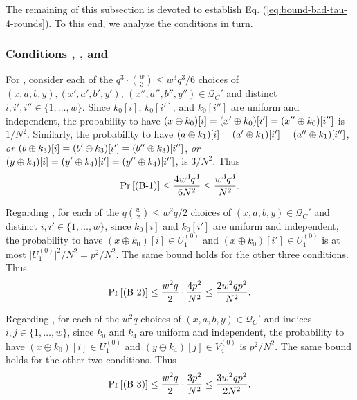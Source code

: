 The remaining of this subsection is devoted to establish Eq. (\ref{eq:bound-bad-tau-4-rounds}). To this end, we analyze the conditions in turn.



%
%
%
\subsubsection{Conditions \bone, \btwo, and \bthree}

For \bone, consider each of the $q^3\cdot{w\choose 3}\leq w^3q^3/6$ choices of $(x,a,b,y),(x',a',b',y')$, $(x'',a'',b'',y'')\in \mathcal{Q}_{C}'$ and distinct $i, i', i'' \in \{1, \ldots, w\}$. Since $k_0[i]$, $k_0[i']$, and $k_0[i'']$ are uniform and independent, the probability to have $(x\oplus k_0)[i]=(x'\oplus k_0)[i']=(x''\oplus k_0)[i'']$ is $1/N^2$. Similarly, the probability to have $(a\oplus k_1)[i]=(a'\oplus k_1)[i']=(a''\oplus k_1)[i'']$, {\it or} $(b\oplus k_3)[i]=(b'\oplus k_3)[i']=(b''\oplus k_3)[i'']$, {\it or} $(y\oplus k_4)[i]=(y'\oplus k_4)[i']=(y''\oplus k_4)[i'']$, is $3/N^2$. Thus
%
$$
\operatorname{Pr}\left[\text{(B-1)}\right] \leq \frac{4w^3q^3}{6N^2}\leq \frac{w^3q^3}{N^2}.
$$
%




%

Regarding \btwo, for each of the $q{w\choose 2}\leq w^2q/2$ choices of $(x,a,b, y) \in \mathcal{Q}_{C}'$ and distinct $i, i' \in \{1, \ldots, w\}$, since $k_0[i]$ and $k_0[i']$ are uniform and independent, the probability to have $(x \oplus k_{0})[i]\in U_1^{(0)}$ and $(x \oplus k_0)[i']\in U_1^{(0)}$ is at most $\big|U_1^{(0)}\big|^2/N^2=p^2/N^2$. The same bound holds for the other three conditions. Thus
%
$$
\operatorname{Pr}\left[\text{(B-2)}\right] \leq \frac{w^{2} q}{2}\cdot\frac{4p^2}{N^2}\leq\frac{2w^{2} q p^2}{N^{2}}.
$$
%




%

Regarding \bthree, for each of the $w^2q$ choices of $(x,a,b,y)\in\mathcal{Q}_{C}'$ and indices $i, j \in \{1, \ldots, w\}$, since $k_{0}$ and $k_{4}$ are uniform and independent, the probability to have $(x \oplus k_{0})[i]\in U_1^{(0)}$ and $(y \oplus k_{4})[j]\in V_4^{(0)}$ is $p^2/N^2$. The same bound holds for the other two conditions. Thus
%
$$
\operatorname{Pr}\left[\text{(B-3)}\right] \leq \frac{w^{2} q}{2}\cdot\frac{3p^2}{N^2}\leq\frac{3w^{2} q p^2}{2N^{2}}.
$$
%




